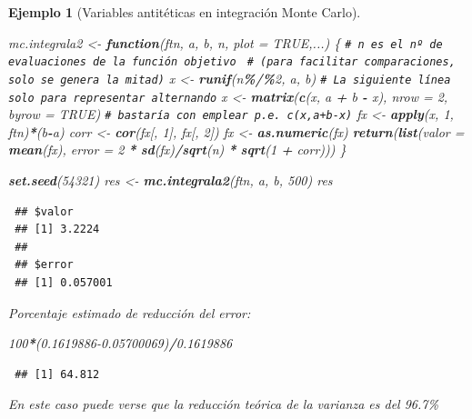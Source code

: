\documentclass[
  spanish,
  10pt,
]{book}
\newenvironment{Shaded}{\begin{snugshade}}{\end{snugshade}}
\newcommand{\AttributeTok}[1]{\textcolor[rgb]{0.13,0.29,0.53}{#1}}
\newcommand{\CommentTok}[1]{\textcolor[rgb]{0.56,0.35,0.01}{\textit{#1}}}
\newcommand{\ConstantTok}[1]{\textcolor[rgb]{0.56,0.35,0.01}{#1}}
\newcommand{\ControlFlowTok}[1]{\textcolor[rgb]{0.13,0.29,0.53}{\textbf{#1}}}
\newcommand{\DecValTok}[1]{\textcolor[rgb]{0.00,0.00,0.81}{#1}}
\newcommand{\FloatTok}[1]{\textcolor[rgb]{0.00,0.00,0.81}{#1}}
\newcommand{\FunctionTok}[1]{\textcolor[rgb]{0.13,0.29,0.53}{\textbf{#1}}}
\newcommand{\NormalTok}[1]{#1}
\newcommand{\OtherTok}[1]{\textcolor[rgb]{0.56,0.35,0.01}{#1}}
\newcommand{\SpecialCharTok}[1]{\textcolor[rgb]{0.81,0.36,0.00}{\textbf{#1}}}
\theoremstyle{break}
\newtheorem{example}{Ejemplo}[chapter]
\theoremstyle{nonumberplain}
\renewcommand{\CommentTok}[1]{\textcolor[rgb]{0.41,0.41,0.41}{\texttt{#1}}}
\begin{document}
\begin{example}[Variables antitéticas en integración Monte Carlo]
\begin{Shaded}
\begin{Highlighting}[]
\NormalTok{mc.integrala2 }\OtherTok{\textless{}{-}} \ControlFlowTok{function}\NormalTok{(ftn, a, b, n, }\AttributeTok{plot =} \ConstantTok{TRUE}\NormalTok{,...) \{}
  \CommentTok{\# n es el nº de evaluaciones de la función objetivo }
  \CommentTok{\# (para facilitar comparaciones, solo se genera la mitad)}
\NormalTok{  x }\OtherTok{\textless{}{-}} \FunctionTok{runif}\NormalTok{(n}\SpecialCharTok{\%/\%}\DecValTok{2}\NormalTok{, a, b)}
  \CommentTok{\# La siguiente línea solo para representar alternando}
\NormalTok{  x }\OtherTok{\textless{}{-}} \FunctionTok{matrix}\NormalTok{(}\FunctionTok{c}\NormalTok{(x, a }\SpecialCharTok{+}\NormalTok{ b }\SpecialCharTok{{-}}\NormalTok{ x), }\AttributeTok{nrow =} \DecValTok{2}\NormalTok{, }\AttributeTok{byrow =} \ConstantTok{TRUE}\NormalTok{)}
  \CommentTok{\# bastaría con emplear p.e. c(x,a+b{-}x)}
\NormalTok{  fx }\OtherTok{\textless{}{-}} \FunctionTok{apply}\NormalTok{(x, }\DecValTok{1}\NormalTok{,  ftn)}\SpecialCharTok{*}\NormalTok{(b}\SpecialCharTok{{-}}\NormalTok{a)}
\NormalTok{  corr }\OtherTok{\textless{}{-}} \FunctionTok{cor}\NormalTok{(fx[, }\DecValTok{1}\NormalTok{], fx[, }\DecValTok{2}\NormalTok{])}
\NormalTok{  fx }\OtherTok{\textless{}{-}} \FunctionTok{as.numeric}\NormalTok{(fx)}
  \FunctionTok{return}\NormalTok{(}\FunctionTok{list}\NormalTok{(}\AttributeTok{valor =} \FunctionTok{mean}\NormalTok{(fx), }\AttributeTok{error =} \DecValTok{2} \SpecialCharTok{*} \FunctionTok{sd}\NormalTok{(fx)}\SpecialCharTok{/}\FunctionTok{sqrt}\NormalTok{(n) }\SpecialCharTok{*} \FunctionTok{sqrt}\NormalTok{(}\DecValTok{1} \SpecialCharTok{+}\NormalTok{ corr)))}
\NormalTok{\}}

\FunctionTok{set.seed}\NormalTok{(}\DecValTok{54321}\NormalTok{)}
\NormalTok{res }\OtherTok{\textless{}{-}} \FunctionTok{mc.integrala2}\NormalTok{(ftn, a, b, }\DecValTok{500}\NormalTok{)}
\NormalTok{res}
\end{Highlighting}
\end{Shaded}

\begin{verbatim}
 ## $valor
 ## [1] 3.2224
 ## 
 ## $error
 ## [1] 0.057001
\end{verbatim}

Porcentaje estimado de reducción del error:

\begin{Shaded}
\begin{Highlighting}[]
\DecValTok{100}\SpecialCharTok{*}\NormalTok{(}\FloatTok{0.1619886{-}0.05700069}\NormalTok{)}\SpecialCharTok{/}\FloatTok{0.1619886}
\end{Highlighting}
\end{Shaded}

\begin{verbatim}
 ## [1] 64.812
\end{verbatim}

En este caso puede verse que la reducción teórica de la varianza es del 96.7\%
\end{example}
\end{document}
